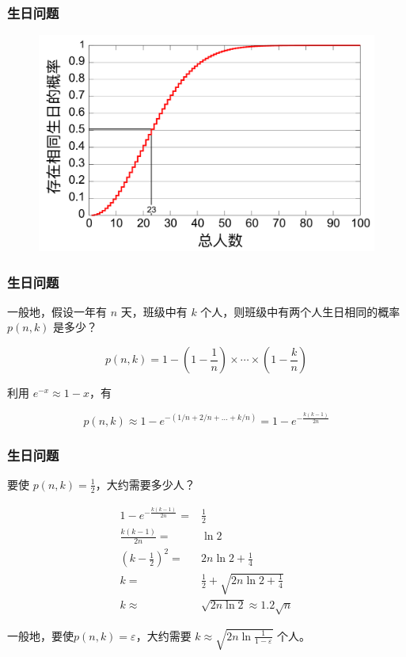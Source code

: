 \documentclass{beamer}
\begin{document}
\begin{frame}
    \frametitle{生日问题}

    \begin{figure}
        \centering
        \includegraphics[width=.7\textwidth]{res/birthday_prob.pdf}
    \end{figure}

\end{frame}

\begin{frame}
    \frametitle{生日问题}

    \begin{problem}
        一般地，假设一年有 $n$ 天，班级中有 $k$ 个人，则班级中有两个人生日相同的概率 $p(n, k)$ 是多少？
    \end{problem}

    \[p(n, k) = 1 - (1 - \frac{1}{n}) \times \cdots \times (1 - \frac{k}{n})\]

    利用 $e^{-x} \approx 1 - x$，有

    \[p(n, k) \approx 1 - e^{-(1/n + 2/n + \dots + k/n)} = 1 - e^{-\frac{k(k - 1)}{2n}}\]

\end{frame}

\begin{frame}
    \frametitle{生日问题}

    要使 $p(n, k) = \frac{1}{2}$，大约需要多少人？

    \[\begin{split}
        1 - e^{-\frac{k(k - 1)}{2n}} = & \frac{1}{2} \\
        \frac{k(k - 1)}{2n} = & \ln 2 \\
        (k - \frac{1}{2})^2 = & 2n\ln 2 + \frac{1}{4} \\
        k = & \frac{1}{2} + \sqrt{2n\ln 2 + \frac{1}{4}} \\
        k \approx & \sqrt{2n\ln 2} \approx 1.2 \sqrt{n}
    \end{split}\]

    一般地，要使$p(n, k) = \varepsilon$，大约需要 $k \approx \sqrt{2n\ln \frac{1}{1 - \varepsilon}}$ 个人。

\end{frame}
\end{document}
